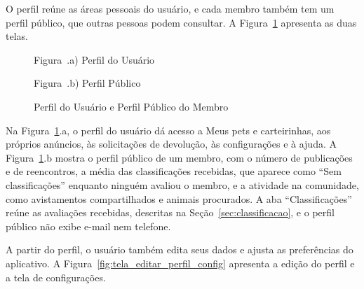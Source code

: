 O perfil reúne as áreas pessoais do usuário, e cada membro também tem um perfil público, que outras pessoas podem consultar. A Figura~\ref{fig:tela_perfil} apresenta as duas telas.

\begin{figure}[H]
    \centering
    \caption{Perfil do Usuário e Perfil Público do Membro}
    \label{fig:tela_perfil}
    \vspace{0.15cm}
    \begin{minipage}[t]{0.48\textwidth}
        \centering
        \par\vspace{0.12cm}
        {\small Figura~\thefigure.a) Perfil do Usuário}
    \end{minipage}
    \hfill
    \begin{minipage}[t]{0.48\textwidth}
        \centering
        \par\vspace{0.12cm}
        {\small Figura~\thefigure.b) Perfil Público}
    \end{minipage}
    \par\vspace{0.12cm}
\end{figure}

Na Figura~\ref{fig:tela_perfil}.a, o perfil do usuário dá acesso a Meus pets e carteirinhas, aos próprios anúncios, às solicitações de devolução, às configurações e à ajuda. A Figura~\ref{fig:tela_perfil}.b mostra o perfil público de um membro, com o número de publicações e de reencontros, a média das classificações recebidas, que aparece como ``Sem classificações'' enquanto ninguém avaliou o membro, e a atividade na comunidade, como avistamentos compartilhados e animais procurados. A aba ``Classificações'' reúne as avaliações recebidas, descritas na Seção~\ref{sec:classificacao}, e o perfil público não exibe e-mail nem telefone.

A partir do perfil, o usuário também edita seus dados e ajusta as preferências do aplicativo. A Figura~\ref{fig:tela_editar_perfil_config} apresenta a edição do perfil e a tela de configurações.

